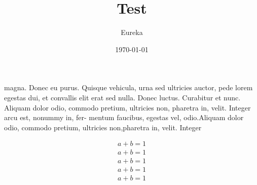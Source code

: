 \documentclass[twocolumn]{article}
\title{Test}
\author{Eureka}
\date{\today}
\begin{document}
\maketitle
\lipsum[1-6]

magna. Donec eu purus. Quisque vehicula, urna sed
ultricies auctor, pede lorem egestas dui, et convallis
elit erat sed nulla. Donec luctus. Curabitur et nunc.
Aliquam dolor odio, commodo pretium, ultricies non,
pharetra in, velit. Integer arcu est, nonummy in, fer-
mentum faucibus, egestas vel, odio.Aliquam dolor odio, 
commodo pretium, ultricies non,pharetra in, velit. Integer 

\begin{align}
  a+b=1\\
  a+b=1\\
  a+b=1\\
  a+b=1\\
  a+b=1
\end{align}
\end{document}
